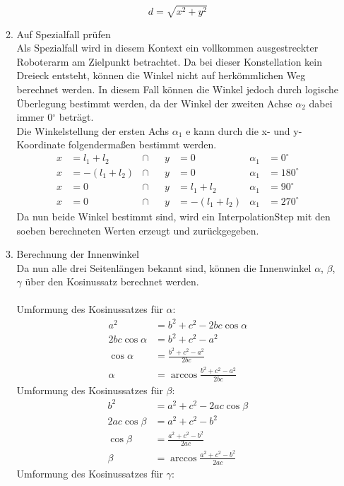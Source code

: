 \begin{itemize}
\begin{enumerate}
\begin{equation*}
d = \sqrt{x^2 + y^2}
\end{equation*}
\item Auf Spezialfall prüfen\\
Als Spezialfall wird in diesem Kontext ein vollkommen ausgestreckter Roboterarm am Zielpunkt betrachtet. Da bei dieser Konstellation kein Dreieck entsteht, können die Winkel nicht auf herkömmlichen Weg berechnet werden. In diesem Fall können die Winkel jedoch durch logische Überlegung bestimmt werden, da der Winkel der zweiten Achse $\alpha_2$ dabei immer 0$^\circ$ beträgt.\\
Die Winkelstellung der ersten Achs $\alpha_1$ e kann durch die x- und y-Koordinate folgendermaßen bestimmt werden.
\begin{align*}
x & = l_1+l_2 &\cap && y & = 0 & \alpha_1 & = 0^\circ \\
x & = -(l_1+l_2) &\cap && y & = 0 & \alpha_1 & = 180^\circ \\ 
x & = 0 &\cap && y & = l_1+l_2 & \alpha_1 & = 90^\circ \\
x & = 0 &\cap && y & = -(l_1+l_2) & \alpha_1 & = 270^\circ
\end{align*}
Da nun beide Winkel bestimmt sind, wird ein InterpolationStep mit den soeben berechneten Werten erzeugt und zurückgegeben.
\newpage
\item Berechnung der Innenwinkel\\
Da nun alle drei Seitenlängen bekannt sind, können die Innenwinkel $\alpha$, $\beta$, $\gamma$ über den Kosinussatz berechnet werden.\\
\\
Umformung des Kosinussatzes für $\alpha$:
\begin{align*}
a^2 & = b^2 + c^2 - 2bc \cos \alpha \\
2bc \cos \alpha & = b^2 + c^2 - a^2 \\
\cos \alpha & = \frac{b^2 + c^2 - a^2}{2bc} \\
\alpha & = \arccos \frac{b^2 + c^2 - a^2}{2bc}
\end{align*}
Umformung des Kosinussatzes für $\beta$:
\begin{align*}
b^2 & = a^2 + c^2 - 2ac \cos \beta \\
2ac \cos \beta & = a^2 + c^2 - b^2 \\
\cos \beta & = \frac{a^2 + c^2 - b^2}{2ac} \\
\beta & = \arccos \frac{a^2 + c^2 - b^2}{2ac}
\end{align*}
Umformung des Kosinussatzes für $\gamma$:

\end{enumerate}
\end{itemize}
